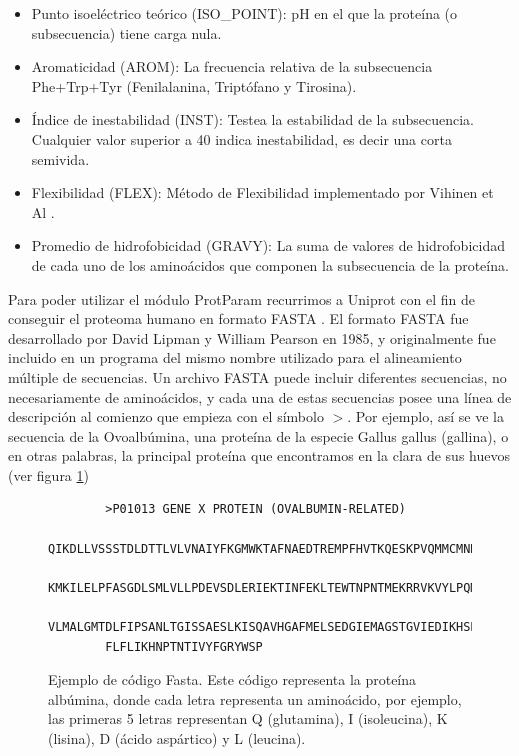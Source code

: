 \begin{itemize}
    \item Punto isoeléctrico teórico (ISO\_POINT): pH en el que la proteína (o subsecuencia) tiene carga nula. 
    \item Aromaticidad (AROM): La frecuencia relativa de la subsecuencia Phe+Trp+Tyr (Fenilalanina, Triptófano y Tirosina). 
    \item Índice de inestabilidad (INST): Testea la estabilidad de la subsecuencia. Cualquier valor superior a 40 indica inestabilidad, es decir una corta semivida.
    \item Flexibilidad (FLEX): Método de Flexibilidad implementado por Vihinen et Al \cite{vihinen1994}.  
    \item Promedio de hidrofobicidad (GRAVY): La suma de valores de hidrofobicidad de cada uno de los aminoácidos que componen la subsecuencia de la proteína.
\end{itemize}


Para poder utilizar el módulo ProtParam recurrimos a Uniprot \cite{uniprot} con el fin de conseguir el proteoma humano en formato FASTA \cite{FASTA}. El formato FASTA fue desarrollado por David Lipman y William Pearson en 1985, y originalmente fue incluido en un programa del mismo nombre utilizado para el alineamiento múltiple de secuencias. Un archivo FASTA puede incluir diferentes secuencias, no necesariamente de aminoácidos, y cada una de estas secuencias posee una línea de descripción al comienzo que empieza con el símbolo $>$. Por ejemplo, así se ve la secuencia de la Ovoalbúmina, una proteína de la especie Gallus gallus (gallina), o en otras palabras, la principal proteína que encontramos en la clara de sus huevos (ver figura \ref{code:fasta_code})

\begin{figure}[H]
    \begin{verbatim}
    	>P01013 GENE X PROTEIN (OVALBUMIN-RELATED)
    	QIKDLLVSSSTDLDTTLVLVNAIYFKGMWKTAFNAEDTREMPFHVTKQESKPVQMMCMNNSFNVATLPAE
    	KMKILELPFASGDLSMLVLLPDEVSDLERIEKTINFEKLTEWTNPNTMEKRRVKVYLPQMKIEEKYNLTS
    	VLMALGMTDLFIPSANLTGISSAESLKISQAVHGAFMELSEDGIEMAGSTGVIEDIKHSPESEQFRADHP
    	FLFLIKHNPTNTIVYFGRYWSP
    \end{verbatim}
\caption{Ejemplo de código Fasta. Este código representa la proteína albúmina, donde cada letra representa un aminoácido, por ejemplo, las primeras 5 letras representan Q (glutamina), I (isoleucina), K (lisina), D (ácido aspártico) y L (leucina).}
\label{code:fasta_code}

\end{figure}

